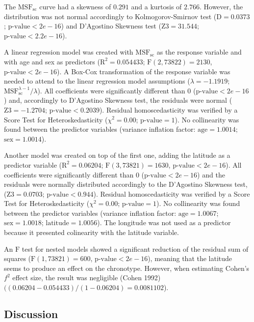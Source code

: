 \documentclass[
  12pt,
  a4paper,
  oneside]{tesesusp}
\begin{document}
The \(\text{MSF}_{\text{sc}}\) curve had a skewness of \(0.291\) and a
kurtosis of \(2.766\). However, the distribution was not normal
accordingly to Kolmogorov-Smirnov test (\(\text{D} = 0.0373\);
\(\text{p-value} < 2e-16\)) and D'Agostino Skewness test
(\(\text{Z3} = 31.544\); \(\text{p-value} < 2.2e-16\)).

A linear regression model was created with \(\text{MSF}_{\text{sc}}\) as
the response variable and with age and sex as predictors
(\(\text{R}^{2} = 0.054433\); \(\text{F}(2, 73822) = 2130\),
\(\text{p-value} < 2e-16\)). A Box-Cox transformation of the response
variable was needed to attend to the linear regression model assumptions
(\(\lambda = -1.1919\);
\(\text{MSF}_{\text{sc}}^{\lambda - 1} / \lambda\)). All coefficients
were significantly different than \(0\) (\(\text{p-value} < 2e-16\))
and, accordingly to D'Agostino Skewness test, the residuals were normal
(\(\text{Z3} = -1.2704\); \(\text{p-value} < 0.2039\)). Residual
homoscedasticity was verified by a Score Test for Heteroskedasticity
(\(\chi^{2} = 0.00\); \(\text{p-value} = 1\)). No collinearity was found
between the predictor variables (variance inflation factor:
\(\text{age} = 1.0014\); \(\text{sex} = 1.0014\)).

Another model was created on top of the first one, adding the latitude
as a predictor variable (\(\text{R}^{2} = 0.06204\);
\(\text{F}(3, 73821) = 1630\), \(\text{p-value} < 2e-16\)). All
coefficients were significantly different than 0
(\(\text{p-value} < 2e-16\)) and the residuals were normally distributed
accordingly to the D'Agostino Skewness test, (\(\text{Z3} = 0.0703\);
\(\text{p-value} < 0.944\)). Residual homoscedasticity was verified by a
Score Test for Heteroskedasticity (\(\chi^{2} = 0.00\);
\(\text{p-value} = 1\)). No collinearity was found between the predictor
variables (variance inflation factor: \(\text{age} = 1.0067\);
\(\text{sex} = 1.0018\); \(\text{latitude} = 1.0056\)). The longitude
was not used as a predictor because it presented colinearity with the
latitude variable.

An \(\text{F}\) test for nested models showed a significant reduction of
the residual sum of squares (\(\text{F}(1, 73821) = 600\),
\(\text{p-value} < 2e-16\)), meaning that the latitude seems to produce
an effect on the chronotype. However, when estimating Cohen's \(f^2\)
effect size, the result was negligible (Cohen 1992)
\(((0.06204 - 0.054433) / (1 - 0.06204) = 0.0081102\)).

\hypertarget{discussion}{%
\subsection{Discussion}\label{discussion}}
\end{document}

